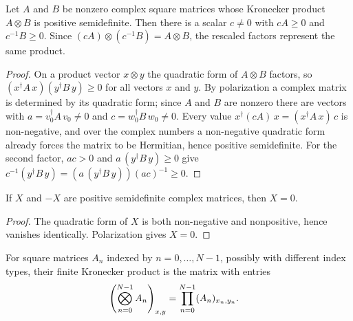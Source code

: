 \begin{lemma}%
    \label{thm:kronecker_factor_positive_rescaling}
    \leanok
    Let $A$ and $B$ be nonzero complex square matrices whose Kronecker
    product $A\otimes B$ is positive semidefinite. Then there is a scalar
    $c\ne0$ with $cA\ge0$ and $c^{-1}B\ge0$. Since
    $(cA)\otimes(c^{-1}B)=A\otimes B$, the rescaled factors represent the
    same product.
\end{lemma}

\begin{proof}
    \leanok
    On a product vector $x\otimes y$ the quadratic form of $A\otimes B$
    factors, so
    $(x^\dagger A\,x)(y^\dagger B\,y)\ge0$ for all
    vectors $x$ and $y$.
    By polarization a complex matrix is determined by its quadratic form;
    since $A$ and $B$ are nonzero there are vectors with
    $a=v_0^\dagger A\,v_0\ne0$ and $c=w_0^\dagger B\,w_0\ne0$. Every value
    $x^\dagger(cA)\,x=(x^\dagger A\,x)\,c$ is non-negative, and over the
    complex numbers a non-negative quadratic form already forces the matrix
    to be Hermitian, hence positive semidefinite. For the second factor,
    $ac>0$ and $a\,(y^\dagger B\,y)\ge0$ give
    $c^{-1}(y^\dagger B\,y)=(a\,(y^\dagger B\,y))(ac)^{-1}\ge0$.
\end{proof}

\begin{lemma}%
    \label{lem:possemidef_and_neg_possemidef}
    \leanok
    If $X$ and $-X$ are positive semidefinite complex matrices, then $X=0$.
\end{lemma}

\begin{proof}
    \leanok
    The quadratic form of $X$ is both non-negative and nonpositive, hence
    vanishes identically. Polarization gives $X=0$.
\end{proof}

\begin{definition}%
    \label{def:finite_kronecker_product}
    \leanok
    For square matrices $A_n$ indexed by $n=0,\ldots,N-1$, possibly with
    different index types, their finite Kronecker product is the matrix with
    entries
    \begin{align}
        \left(\bigotimes_{n=0}^{N-1}A_n\right)_{x,y}
         & =\prod_{n=0}^{N-1}(A_n)_{x_n,y_n}.
        \notag
    \end{align}
\end{definition}

